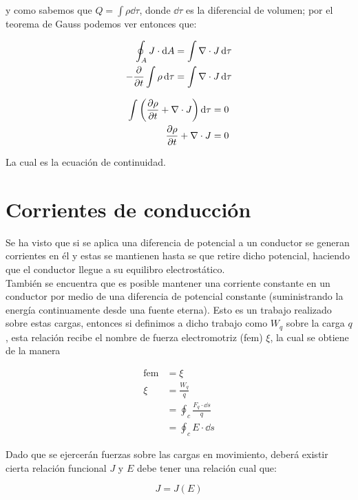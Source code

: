 \documentclass[11pt]{report}
\theoremstyle{plain}
\theoremstyle{definition}
\begin{document}
y como sabemos que $Q = \int \rho \dd{\tau}$, donde $\dd{\tau}$ es la diferencial de volumen; por el teorema de Gauss podemos ver entonces que:

\begin{align*}
	\oint_A J \cdot \dd{A} &= \int \nabla \cdot J \dd{\tau}\\
	-\pdv{t}\int \rho \dd{\tau} &= \int \nabla \cdot J \dd{\tau}
\end{align*}

\begin{align*}
	\int \left( \pdv{\rho}{t} + \nabla \cdot J \right) \dd{\tau} &= 0\\
	\pdv{\rho}{t} + \nabla \cdot J &= 0
\end{align*}

La cual es la ecuación de continuidad.
\section*{Corrientes de conducción}

Se ha visto que si se aplica una diferencia de potencial a un conductor se generan corrientes en él y estas se mantienen hasta se que retire dicho potencial, haciendo que el conductor llegue a su equilibro electrostático.\\
También se encuentra que es posible mantener una corriente constante en un conductor por medio de una diferencia de potencial constante (suministrando la energía continuamente desde una fuente eterna). Esto es un trabajo realizado sobre estas cargas, entonces si definimos a dicho trabajo como $W_q$ sobre la carga $q$, esta relación recibe el nombre de fuerza electromotriz (fem) $\xi$, la cual se obtiene de la manera

\begin{align*}
	\text{fem} &= \xi\\
	\xi &= \frac{W_q}{q}\\
	&= \oint_c \frac{F_q \cdot \dd{s}}{q}\\
	&= \oint_c E\cdot\dd{s}
\end{align*}

Dado que se ejercerán fuerzas sobre las cargas en movimiento, deberá existir cierta relación
funcional $J$ y $E$ debe tener una relación cual que:

\begin{equation}
	J = J(E)
\end{equation}

\end{document}
